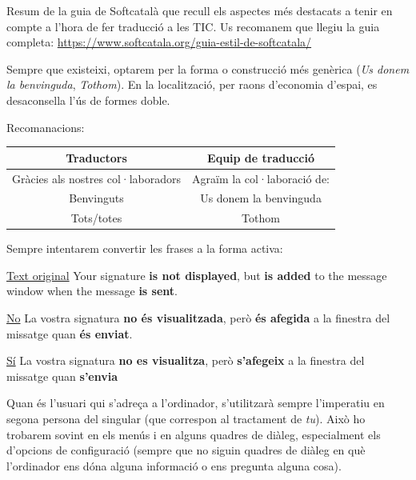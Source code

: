 \documentclass[9pt]{cheatsheet}
\begin{document}
Resum de la guia de Softcatalà que recull els aspectes més destacats a tenir en compte  a l'hora de fer traducció a les TIC. Us recomanem que llegiu la guia completa: \url{https://www.softcatala.org/guia-estil-de-softcatala/}

\begin{multicols*}{3}



Sempre que existeixi, optarem per la forma o construcció més genèrica (\emph{Us donem la benvinguda}, \emph{Tothom}). En la localització, per raons d'economia d'espai, es desaconsella l'ús de formes doble.

Recomanacions:

\begin{tabular}{| c | c |}
 \hline
 Traductors & Equip de traducció \\
 \hline
 Gràcies als nostres col·laboradors & Agraïm la col·laboració de: \\
 \hline
 Benvinguts & Us donem la benvinguda \\
 \hline
 Tots/totes & Tothom \\
 \hline
\end{tabular}


Sempre intentarem convertir les frases a la forma activa:

\underline {Text original} Your signature \textbf{is not displayed}, but \textbf{is added} to the message window when the message \textbf{is sent}.

\underline {No} La vostra signatura \textbf{no és visualitzada}, però \textbf{és afegida} a la finestra del missatge quan \textbf{és enviat}.

\underline {Sí} La vostra signatura \textbf{no es visualitza}, però \textbf{s'afegeix} a la finestra del missatge quan \textbf{s'envia}



Quan és l'usuari qui s'adreça a l'ordinador, s'utilitzarà sempre l'imperatiu en segona persona del singular (que correspon al tractament de \emph{tu}). Això ho trobarem sovint en els menús i en alguns quadres de diàleg, especialment els d'opcions de configuració (sempre que no siguin quadres de diàleg en què l'ordinador ens dóna alguna informació o ens pregunta alguna cosa).


\end{multicols*}
\end{document}
